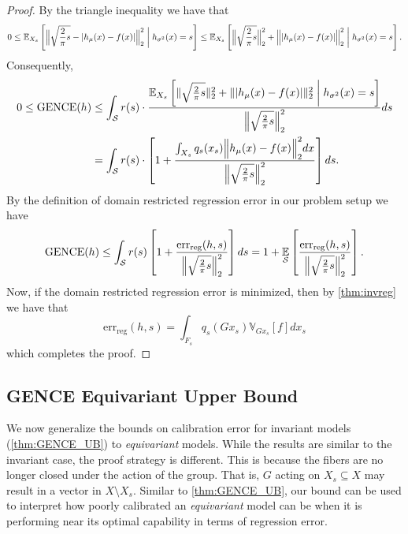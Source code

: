 \documentclass[10pt]{article} %
\theoremstyle{definition}
\newcommand{\GENCE}{\mathrm{GENCE}(h)}
\begin{document}
\begin{proof} By the triangle inequality we have that
%
\begin{equation*}
0 \leq \mathbb{E}_{X_s}\left[\Bigl\lVert \sqrt{\frac{2}{\pi}s} - | h_{\mu}(x) - f(x)| \Bigr\rVert _2^2 \biggm| h_{\sigma^2}(x) = s \right] \leq \mathbb{E}_{X_s}\left[\Bigl\lVert \sqrt{\frac{2}{\pi}s}   \Bigr\rVert_2^2 + \Bigl\lVert| h_{\mu}(x) - f(x)| \Bigr\rVert _2^2 \biggm| h_{\sigma^2}(x) = s\right] .
\end{equation*}
%
Consequently,
%
\begin{align*}
0 \leq \GENCE &\leq \int_{\mathcal{S}} r(s) 
 \cdot \frac{\mathbb{E}_{X_s}\left[ \lVert \sqrt{\frac{2}{\pi}s}  \rVert_2^2 + \lVert| h_{\mu}(x) - f(x)| \rVert _2^2 \biggm| h_{\sigma^2}(x) = s \right] }{\Bigl \lVert \sqrt{\frac{2}{\pi}s}  \Bigr \rVert_2^2}ds\\
&= \int_{\mathcal{S}} r(s) 
\cdot \left[1 + \frac{\int_{X_s}q_s(x_s)\Bigl\lVert h_{\mu}(x) - f(x) \Bigr\rVert _2^2  dx}{\Bigl \lVert \sqrt{\frac{2}{\pi}s}  \Bigr \rVert_2^2} \right]ds.
\end{align*}
%
By the definition of domain restricted regression error in our problem setup we have
\begin{align}
\GENCE \leq \int_{\mathcal{S}} r(s) \left[1 + \frac{\text{err}_{\text{reg}}(h, s)}{ \Bigl \lVert \sqrt{\frac{2}{\pi}s}  \Bigr \rVert_2^2} \right]ds = 1 + \underset{\mathcal{S}}{\mathbb{E}}\left[\frac{\text{err}_{\text{reg}}(h, s)}{ \Bigl \lVert \sqrt{\frac{2}{\pi}s} \Bigl  \rVert_2^2}\right]. \label{eq:expratio}
\end{align}
Now, if the domain restricted regression error is minimized, then by \cref{thm:invreg} we have that
%
\begin{equation}
\text{err}_{\text{reg}}(h, s) =  \int_{F_s}q_s(Gx_s) \mathbb{V}_{Gx_s}[f]dx_s \label{eq:specialcase}
\end{equation}
%
which completes the proof.
\end{proof}

\subsection{GENCE Equivariant Upper Bound} 
\label{sec:equivariant_regression_bound}

We now generalize the bounds on calibration error for invariant models (\cref{thm:GENCE_UB}) to \textit{equivariant} models. While the results are similar to the invariant case, the proof strategy is different. This is because the fibers are no longer closed under the action of the group. That is, $G$ acting on $X_s \subseteq X$ may result in a vector in $X \setminus X_s$. Similar to \cref{thm:GENCE_UB}, our bound can be used to interpret how poorly calibrated an \textit{equivariant} model can be when it is performing near its optimal capability in terms of regression error.
\end{document}
